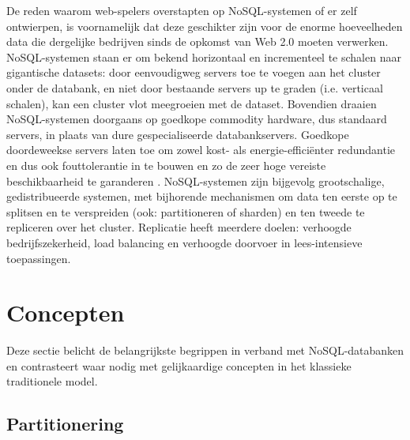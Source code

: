 De reden waarom web-spelers overstapten op NoSQL-systemen of er zelf ontwierpen, is voornamelijk dat deze geschikter zijn voor de enorme hoeveelheden data die dergelijke bedrijven sinds de opkomst van Web 2.0 moeten verwerken. NoSQL-systemen staan er om bekend horizontaal en incrementeel te schalen naar gigantische datasets: door eenvoudigweg servers toe te voegen aan het cluster onder de databank, en niet door bestaande servers up te graden (i.e. verticaal schalen), kan een cluster vlot meegroeien met de dataset. Bovendien draaien NoSQL-systemen doorgaans op goedkope commodity hardware, dus standaard servers, in plaats van dure gespecialiseerde databankservers. Goedkope doordeweekse servers laten toe om zowel kost- als energie-effici\"enter redundantie en dus ook fouttolerantie in te bouwen en zo de zeer hoge vereiste beschikbaarheid te garanderen \cite{barroso2003web}. NoSQL-systemen zijn bijgevolg grootschalige, gedistribueerde systemen, met bijhorende mechanismen om data ten eerste op te splitsen en te verspreiden (ook: partitioneren of sharden) en ten tweede te repliceren over het cluster. Replicatie heeft meerdere doelen: verhoogde bedrijfszekerheid, load balancing en verhoogde doorvoer in lees-intensieve toepassingen.

\section{Concepten}

Deze sectie belicht de belangrijkste begrippen in verband met NoSQL-databanken en contrasteert waar nodig met gelijkaardige concepten in het klassieke traditionele model.

\subsection{Partitionering}

